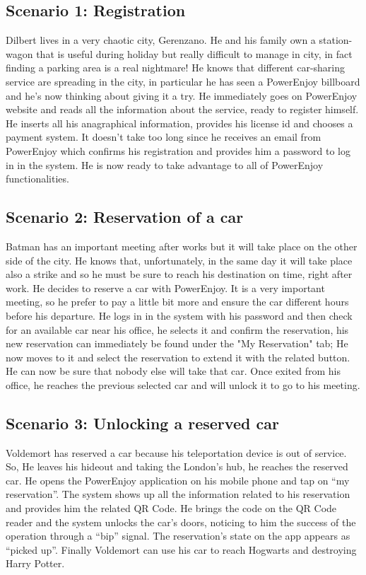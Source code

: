 \documentclass[10pt, a4paper,titlepage]{article}
\begin{document}
\subsection{Scenario 1: Registration}
Dilbert lives in a very chaotic city, Gerenzano. He and his family own a station-wagon that is useful during holiday but really difficult to manage in city, in fact finding a parking area is a real nightmare! He knows that different car-sharing service are spreading in the city, in particular he has seen a PowerEnjoy billboard and he's now thinking about giving it a try. He immediately  goes on PowerEnjoy website and reads all the information about the service, ready to register himself. 
He inserts all his anagraphical information, provides his license id and chooses a payment system. It doesn't take too long since he receives an email from PowerEnjoy which confirms his registration and provides him a password to log in in the system.
He is now ready to take advantage to all of PowerEnjoy functionalities.
\subsection{Scenario 2: Reservation of a car}
Batman has an important meeting after works but it will take place on the other side of the city. He knows that, unfortunately,  in the same day it will take place also a strike and so he must be sure to reach his destination on time, right after work.
He decides to reserve a car with PowerEnjoy. It is a very important meeting, so he prefer to pay a little bit more and ensure the car different hours before his departure.
He logs in in the system with his password and then check for an available car near his office, he selects it and confirm the reservation, his new reservation can immediately be found under the "My Reservation" tab; He now moves to it and select the reservation to extend it with the related button. 
He  can now be sure that nobody else will take that car. 
Once exited from his office, he reaches the previous selected car and will unlock it to go to his meeting.
\subsection{Scenario 3: Unlocking a reserved car}
Voldemort has reserved a car because his teleportation device is out of service. So, He leaves his hideout and taking the London's hub, he reaches the reserved car. He opens the PowerEnjoy application on his mobile phone and tap on “my reservation”. The system shows up all the information related to his reservation and provides him the related QR Code. He brings the code on the QR Code reader and the system unlocks the car's doors, noticing to him the success of the operation through a “bip” signal. The reservation's state on the app appears as “picked up”. Finally Voldemort can use his car to reach Hogwarts and destroying Harry Potter.
\end{document}
